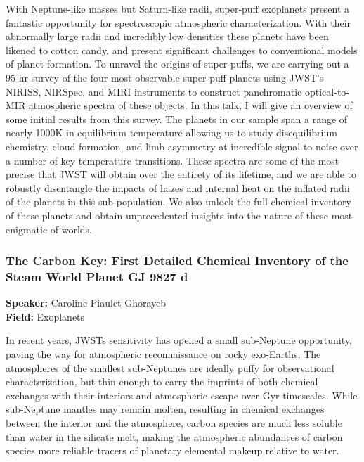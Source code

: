 With Neptune-like masses but Saturn-like radii, super-puff exoplanets present a fantastic opportunity for spectroscopic atmospheric characterization. With their abnormally large radii and incredibly low densities these planets have been likened to cotton candy, and present significant challenges to conventional models of planet formation. To unravel the origins of super-puffs, we are carrying out a 95 hr survey of the four most observable super-puff planets using JWST's NIRISS, NIRSpec, and MIRI instruments to construct panchromatic optical-to-MIR atmospheric spectra of these objects. In this talk, I will give an overview of some initial results from this survey. The planets in our sample span a range of nearly 1000K in equilibrium temperature allowing us to study disequilibrium chemistry, cloud formation, and limb asymmetry at incredible signal-to-noise over a number of key temperature transitions. These spectra are some of the most precise that JWST will obtain over the entirety of its lifetime, and we are able to robustly disentangle the impacts of hazes and internal heat on the inflated radii of the planets in this sub-population. We also unlock the full chemical inventory of these planets and obtain unprecedented insights into the nature of these most enigmatic of worlds.

\hypertarget{abstract-talk-126}{}\label{abstract-page-talk-126}
\subsubsection*{The Carbon Key: First Detailed Chemical Inventory of the Steam World Planet GJ 9827 d}
\textbf{Speaker:} Caroline Piaulet-Ghorayeb\\
\textbf{Field:} Exoplanets

In recent years, JWSTs sensitivity has opened a small sub-Neptune opportunity, paving the way for atmospheric reconnaissance on rocky exo-Earths. The atmospheres of the smallest sub-Neptunes are ideally puffy for observational characterization, but thin enough to carry the imprints of both chemical exchanges with their interiors and atmospheric escape over Gyr timescales. While sub-Neptune mantles may remain molten, resulting in chemical exchanges between the interior and the atmosphere, carbon species are much less soluble than water in the silicate melt, making the atmospheric abundances of carbon species more reliable tracers of planetary elemental makeup relative to water.

